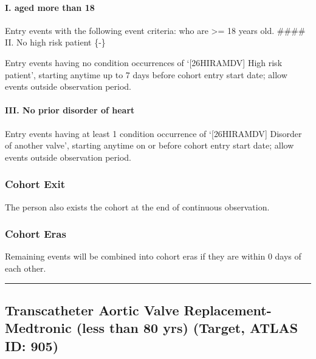 \documentclass[
  12pt,
]{article}
\begin{document}
\paragraph*{I. aged more than 18}\label{i.-aged-more-than-18-2}

Entry events with the following event criteria: who are \textgreater= 18
years old. \#\#\#\# II. No high risk patient \{-\}

Entry events having no condition occurrences of `{[}26HIRAMDV{]} High
risk patient', starting anytime up to 7 days before cohort entry start
date; allow events outside observation period.

\paragraph*{III. No prior disorder of
heart}\label{iii.-no-prior-disorder-of-heart-2}

Entry events having at least 1 condition occurrence of `{[}26HIRAMDV{]}
Disorder of another valve', starting anytime on or before cohort entry
start date; allow events outside observation period.

\subsubsection{Cohort Exit}\label{cohort-exit-4}

The person also exists the cohort at the end of continuous observation.

\subsubsection{Cohort Eras}\label{cohort-eras-4}

Remaining events will be combined into cohort eras if they are within 0
days of each other.

\begin{center}\rule{0.5\linewidth}{0.5pt}\end{center}

\subsection{Transcatheter Aortic Valve Replacement-Medtronic (less than
80 yrs) (Target, ATLAS ID:
905)}\label{transcatheter-aortic-valve-replacement-medtronic-less-than-80-yrs-target-atlas-id-905}
\end{document}
